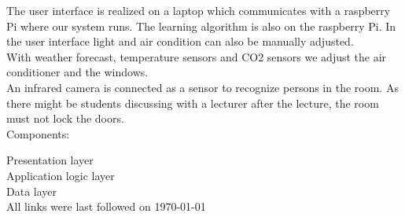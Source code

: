 \documentclass[runningheads]{llncs}
\begin{document}
The user interface is realized on a laptop which communicates with a raspberry Pi where our system runs. The learning algorithm is also on the raspberry Pi. In the user interface light and air condition can also be manually adjusted.\\

With weather forecast, temperature sensors and CO2 sensors we adjust the air conditioner and the windows. \\

An infrared camera is connected as a sensor to recognize persons in the room. As there might be students discussing with a lecturer after the lecture, the room must not lock the doors. \\ 



Components:


Presentation layer\\
Application logic layer\\
Data layer \\

%
%



All links were last followed on \today
\end{document}

